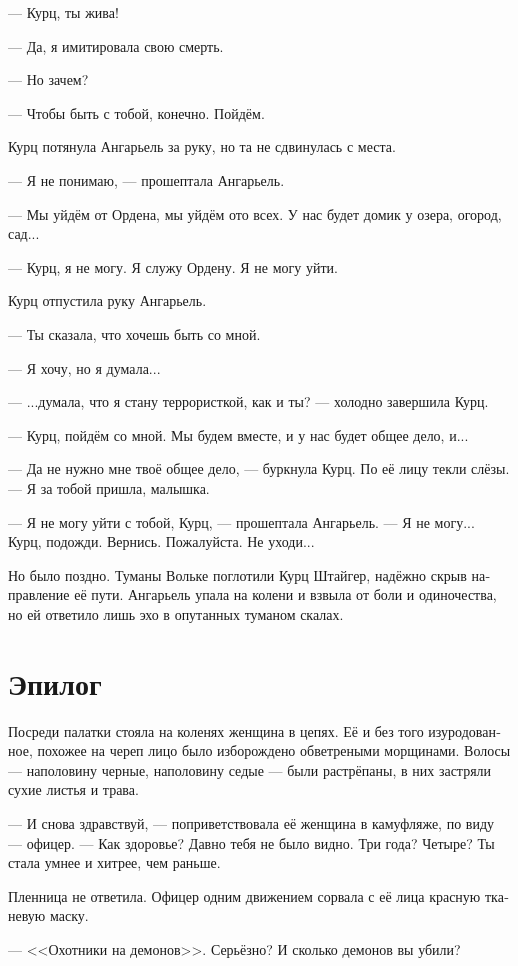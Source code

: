 \documentclass[a4paper,12pt,fleqn]{book}\usepackage{cooltooltips}\usepackage{polyglossia}\setdefaultlanguage[babelshorthands=true]{russian}\setotherlanguage{english}\defaultfontfeatures{Ligatures=TeX,Mapping=tex-text} \usepackage{xcolor}\definecolor{lightgray}{HTML}{bbbbbb}\color{lightgray}\newcommand{\ml}[3]{\textenglish{\textcolor{black}{#3}}}
\begin{document}
--- Курц, ты жива!

--- Да, я имитировала свою смерть.

--- Но зачем?

--- Чтобы быть с тобой, конечно.
Пойдём.

Курц потянула Ангарьель за руку, но та не сдвинулась с места.

--- Я не понимаю, --- прошептала Ангарьель.

--- Мы уйдём от Ордена, мы уйдём ото всех.
У нас будет домик у озера, огород, сад...

--- Курц, я не могу.
Я служу Ордену.
Я не могу уйти.

Курц отпустила руку Ангарьель.

--- Ты сказала, что хочешь быть со мной.

--- Я хочу, но я думала...

--- ...думала, что я стану террористкой, как и ты? --- холодно завершила Курц.

--- Курц, пойдём со мной.
Мы будем вместе, и у нас будет общее дело, и...

--- Да не нужно мне твоё общее дело, --- буркнула Курц.
По её лицу текли слёзы.
--- Я за тобой пришла, малышка.

--- Я не могу уйти с тобой, Курц, --- прошептала Ангарьель.
--- Я не могу...
Курц, подожди.
Вернись.
Пожалуйста.
Не уходи...

Но было поздно.
Туманы Вольке поглотили Курц Штайгер, надёжно скрыв направление её пути.
Ангарьель упала на колени и взвыла от боли и одиночества, но ей ответило лишь эхо в опутанных туманом скалах.

\section{Эпилог}

Посреди палатки стояла на коленях женщина в цепях.
Её и без того изуродованное, похожее на череп лицо было изборождено обветреными морщинами.
Волосы --- наполовину черные, наполовину седые --- были растрёпаны, в них застряли сухие листья и трава.

--- И снова здравствуй, --- поприветствовала её женщина в камуфляже, по виду --- офицер.
--- Как здоровье?
Давно тебя не было видно.
Три года?
Четыре?
Ты стала умнее и хитрее, чем раньше.

Пленница не ответила.
Офицер одним движением сорвала с её лица красную тканевую маску.

--- <<Охотники на демонов>>.
Серьёзно?
И сколько демонов вы убили?
\end{document}
